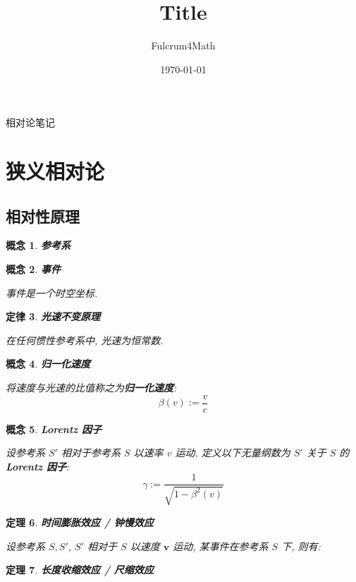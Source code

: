 \documentclass[UTF8]{ctexart}
\title{Title}
\author{Fulcrum4Math}
\date{\today}
\newcommand{\<}{\langle}
\renewcommand{\>}{\rangle}                              %
\newenvironment{dfn_box}{
    \begin{tcolorbox}[enhanced, colback=dfn_green2, boxrule=0pt, frame hidden,
        borderline west={0.7mm}{0.1mm}{dfn_green1},breakable]
    }
    {\end{tcolorbox}}
\newenvironment{axm_box}{
    \begin{tcolorbox}[enhanced, colback=axm_yellow2, boxrule=0pt, frame hidden,
        borderline west={0.7mm}{0.1mm}{axm_yellow1},breakable]
    }
    {\end{tcolorbox}}
\newenvironment{thm_box}{
    \begin{tcolorbox}[enhanced, colback=thm_blue2, boxrule=0pt, frame hidden,
        borderline west={0.7mm}{0.1mm}{thm_blue1},breakable]
    }
    {\end{tcolorbox}}
\theoremstyle{MyStyle} %
\newtheorem{definition}{概念}[subsection]
\newenvironment{cpt}{\begin{dfn_box}\begin{definition}}{\end{definition}\end{dfn_box}}
\newtheorem{axm}[definition]{定律}
\newenvironment{thr}{\begin{axm_box}\begin{axm}}{\end{axm}\end{axm_box}}
\newtheorem{theorem}[definition]{定理}
\newenvironment{thm}{\begin{thm_box}\begin{theorem}}{\end{theorem}\end{thm_box}}
\begin{document}
\begin{center}
    {\LARGE 相对论笔记}
\end{center}

\section{狭义相对论}

    \subsection{相对性原理}
        
        \begin{cpt}
            \textbf{参考系}
        \end{cpt}
        
        \begin{cpt}
            \textbf{事件}

            事件是一个时空坐标. 
        \end{cpt}
        
        \begin{thr}
            \textbf{光速不变原理}

            在任何惯性参考系中, 光速为恒常数. 
        \end{thr}
        
        \begin{cpt}
            \textbf{归一化速度}

            将速度与光速的比值称之为\textbf{归一化速度}: 
            \[\beta(v):=\frac{v}{c}\]
        \end{cpt}
        
        \begin{cpt}
            \textbf{Lorentz 因子}

            设参考系 \(S'\) 相对于参考系 \(S\) 以速率 \(v\) 运动, 定义以下无量纲数为 \(S'\) 关于 \(S\) 的 \textbf{Lorentz 因子}: 
            \[\gamma:=\frac{1}{\sqrt{1-\beta^2(v)}}\]
        \end{cpt}
        
        \begin{thm}
            \textbf{时间膨胀效应 / 钟慢效应}
            
            设参考系 \(S, S'\), \(S'\) 相对于 \(S\) 以速度 \(\bm{v}\) 运动, 某事件在参考系 \(S\) 下, 则有: 
            \[\]
        \end{thm}
        
        \begin{thm}
            \textbf{长度收缩效应 / 尺缩效应}
        \end{thm}
        
\end{document}
